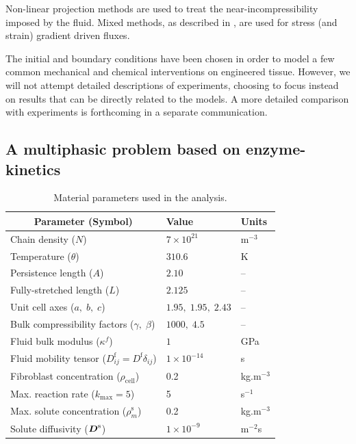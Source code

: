 Non-linear projection methods \citep{simotaylorpister:85} are used to treat the
near-incompressibility imposed by the fluid. Mixed methods, as described
in \cite{Garikipatiox2:01}, are used for stress (and strain) gradient
driven fluxes.

The initial and boundary
conditions have been chosen in order to model a few common mechanical and
chemical interventions on engineered tissue. However, we will not
attempt detailed descriptions of experiments, choosing to focus
instead on results that can be directly related to the models. A more
detailed comparison with experiments is forthcoming in a separate
communication. 

\subsection{A multiphasic problem based on enzyme-kinetics}
\label{enzyme_kinetics_eg}

\begin{table}
\centering
\begin{tabular}{lll}
\hline
\multicolumn{1}{c}{Parameter (Symbol)} & Value & Units\\
\hline
Chain density ($N$) & $7\times 10^{21}$ & $\mathrm{m}^{-3}$\\
Temperature ($\theta$)  & $310.6$ & K\\
Persistence length ($A$) & $2.10$ & --\\
Fully-stretched length ($L$) & $2.125$ & --\\
Unit cell axes ($a,\;b,\;c$) & $1.95,\;1.95,\;2.43$ & --\\
Bulk compressibility factors ($\gamma,\;\beta$) & $1000,\; 4.5$ & --\\
Fluid bulk modulus ($\kappa^f$) & $1$ & GPa\\
Fluid mobility tensor ($D^\mathrm{f}_{ij} = D^\mathrm{f}\delta_{ij}$) & $1\times 10^{-14}$
&s\\
Fibroblast concentration ($\rho_{\mathrm{cell}}$) & 0.2 &
kg.m$^{-3}$\\
Max. reaction rate ($k_{\mathrm{max}} = 5$) & 5 & s$^{-1}$\\
Max. solute concentration ($\rho^{\mathrm{s}}_m$) & 0.2 &
kg.m$^{-3}$\\
Solute diffusivity ($\mbox{\boldmath$ D$}^\mathrm{s}$) & $1\times 10^{-9}$ &  m$^{-2}$s\\
\hline
\end{tabular}
\caption{Material parameters used in the analysis.}
\label{parameters}
\end{table}

